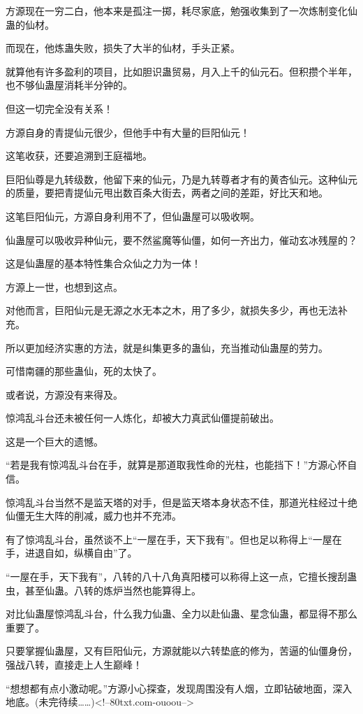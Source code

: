\begin{this_body}
方源现在一穷二白，他本来是孤注一掷，耗尽家底，勉强收集到了一次炼制变化仙蛊的仙材。

而现在，他炼蛊失败，损失了大半的仙材，手头正紧。

就算他有许多盈利的项目，比如胆识蛊贸易，月入上千的仙元石。但积攒个半年，也不够仙蛊屋消耗半分钟的。

但这一切完全没有关系！

方源自身的青提仙元很少，但他手中有大量的巨阳仙元！

这笔收获，还要追溯到王庭福地。

巨阳仙尊是九转级数，他留下来的仙元，乃是九转尊者才有的黄杏仙元。这种仙元的质量，要把青提仙元甩出数百条大街去，两者之间的差距，好比天和地。

这笔巨阳仙元，方源自身利用不了，但仙蛊屋可以吸收啊。

仙蛊屋可以吸收异种仙元，要不然鲨魔等仙僵，如何一齐出力，催动玄冰残屋的？

这是仙蛊屋的基本特性集合众仙之力为一体！

方源上一世，也想到这点。

对他而言，巨阳仙元是无源之水无本之木，用了多少，就损失多少，再也无法补充。

所以更加经济实惠的方法，就是纠集更多的蛊仙，充当推动仙蛊屋的劳力。

可惜南疆的那些蛊仙，死的太快了。

或者说，方源没有来得及。

惊鸿乱斗台还未被任何一人炼化，却被大力真武仙僵提前破出。

这是一个巨大的遗憾。

“若是我有惊鸿乱斗台在手，就算是那道取我性命的光柱，也能挡下！”方源心怀自信。

惊鸿乱斗台当然不是监天塔的对手，但是监天塔本身状态不佳，那道光柱经过十绝仙僵无生大阵的削减，威力也并不充沛。

有了惊鸿乱斗台，虽然谈不上“一屋在手，天下我有”。但也足以称得上“一屋在手，进退自如，纵横自由”了。

“一屋在手，天下我有”，八转的八十八角真阳楼可以称得上这一点，它擅长搜刮蛊虫，甚至仙蛊。八转的炼炉当然也能算得上。

对比仙蛊屋惊鸿乱斗台，什么我力仙蛊、全力以赴仙蛊、星念仙蛊，都显得不那么重要了。

只要掌握仙蛊屋，又有巨阳仙元，方源就能以六转垫底的修为，苦逼的仙僵身份，强战八转，直接走上人生巅峰！

“想想都有点小激动呢。”方源小心探查，发现周围没有人烟，立即钻破地面，深入地底。(未完待续……)<!--80txt.com-ouoou-->

\end{this_body}

